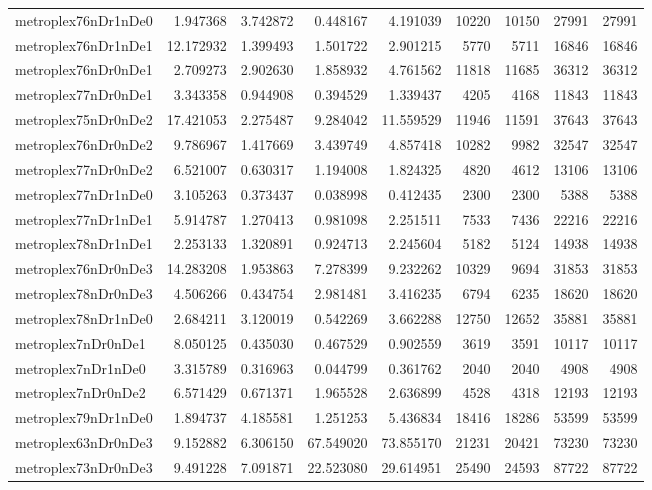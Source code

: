 \begin{longtable}{|l|r|r|r|r|r|r|r|r|}
metroplex76nDr1nDe0 & 1.947368 & 3.742872 & 0.448167 & 4.191039 & 10220 & 10150 & 27991 & 27991 \\
metroplex76nDr1nDe1 & 12.172932 & 1.399493 & 1.501722 & 2.901215 & 5770 & 5711 & 16846 & 16846 \\
metroplex76nDr0nDe1 & 2.709273 & 2.902630 & 1.858932 & 4.761562 & 11818 & 11685 & 36312 & 36312 \\
metroplex77nDr0nDe1 & 3.343358 & 0.944908 & 0.394529 & 1.339437 & 4205 & 4168 & 11843 & 11843 \\
metroplex75nDr0nDe2 & 17.421053 & 2.275487 & 9.284042 & 11.559529 & 11946 & 11591 & 37643 & 37643 \\
metroplex76nDr0nDe2 & 9.786967 & 1.417669 & 3.439749 & 4.857418 & 10282 & 9982 & 32547 & 32547 \\
metroplex77nDr0nDe2 & 6.521007 & 0.630317 & 1.194008 & 1.824325 & 4820 & 4612 & 13106 & 13106 \\
metroplex77nDr1nDe0 & 3.105263 & 0.373437 & 0.038998 & 0.412435 & 2300 & 2300 & 5388 & 5388 \\
metroplex77nDr1nDe1 & 5.914787 & 1.270413 & 0.981098 & 2.251511 & 7533 & 7436 & 22216 & 22216 \\
metroplex78nDr1nDe1 & 2.253133 & 1.320891 & 0.924713 & 2.245604 & 5182 & 5124 & 14938 & 14938 \\
metroplex76nDr0nDe3 & 14.283208 & 1.953863 & 7.278399 & 9.232262 & 10329 & 9694 & 31853 & 31853 \\
metroplex78nDr0nDe3 & 4.506266 & 0.434754 & 2.981481 & 3.416235 & 6794 & 6235 & 18620 & 18620 \\
metroplex78nDr1nDe0 & 2.684211 & 3.120019 & 0.542269 & 3.662288 & 12750 & 12652 & 35881 & 35881 \\
metroplex7nDr0nDe1 & 8.050125 & 0.435030 & 0.467529 & 0.902559 & 3619 & 3591 & 10117 & 10117 \\
metroplex7nDr1nDe0 & 3.315789 & 0.316963 & 0.044799 & 0.361762 & 2040 & 2040 & 4908 & 4908 \\
metroplex7nDr0nDe2 & 6.571429 & 0.671371 & 1.965528 & 2.636899 & 4528 & 4318 & 12193 & 12193 \\
metroplex79nDr1nDe0 & 1.894737 & 4.185581 & 1.251253 & 5.436834 & 18416 & 18286 & 53599 & 53599 \\
metroplex63nDr0nDe3 & 9.152882 & 6.306150 & 67.549020 & 73.855170 & 21231 & 20421 & 73230 & 73230 \\
metroplex73nDr0nDe3 & 9.491228 & 7.091871 & 22.523080 & 29.614951 & 25490 & 24593 & 87722 & 87722 \\

\end{longtable}
